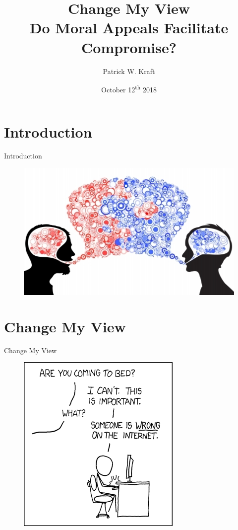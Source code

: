 \documentclass{beamer}
\author{Patrick W. Kraft}
\title{Change My View\\
{\large Do Moral Appeals Facilitate Compromise?}}
\institute{MAPPS Meeting\\Marquette University}
\date{October 12\textsuperscript{th} 2018}
\begin{document}
\section{Introduction}
\frame{\titlepage}
%

\begin{frame}{Introduction}
\begin{figure}
\includegraphics[scale=.9]{fig/the-conversation.jpeg}
\end{figure}
\end{frame}

\section{Change My View}
%

\begin{frame}{Change My View}
\begin{figure}
\includegraphics[height=.6\textheight]{fig/duty_calls.png}
\end{figure}
\end{frame}
\end{document}
